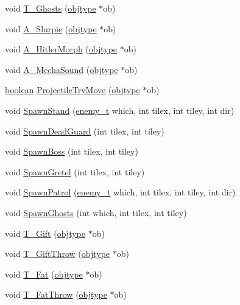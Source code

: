 \begin{DoxyCompactItemize}
\item 
void \hyperlink{WL__ACT2_8C_a6bde7f5f6c9bef2510fd97adacbfd707}{T\_\-Ghosts} (\hyperlink{structobjstruct}{objtype} $\ast$ob)
\item 
void \hyperlink{WL__ACT2_8C_ad293e10281b57a35c52a559ba0979185}{A\_\-Slurpie} (\hyperlink{structobjstruct}{objtype} $\ast$ob)
\item 
void \hyperlink{WL__ACT2_8C_a8a9aba9ebfcb76d0d265b74c5d426acf}{A\_\-HitlerMorph} (\hyperlink{structobjstruct}{objtype} $\ast$ob)
\item 
void \hyperlink{WL__ACT2_8C_ac61858cc2d5a743c8224a2a27190fb11}{A\_\-MechaSound} (\hyperlink{structobjstruct}{objtype} $\ast$ob)
\item 
\hyperlink{ID__HEAD_8H_a7c6368b321bd9acd0149b030bb8275ed}{boolean} \hyperlink{WL__ACT2_8C_a219833341ac800da7f9e17e5fb369722}{ProjectileTryMove} (\hyperlink{structobjstruct}{objtype} $\ast$ob)
\item 
void \hyperlink{WL__ACT2_8C_a50e3fd0352d390adb00570c075e6bb23}{SpawnStand} (\hyperlink{WL__DEF_8H_a170079e8c026d22e4de4683611bc7a50}{enemy\_\-t} which, int tilex, int tiley, int dir)
\item 
void \hyperlink{WL__ACT2_8C_a12fd6ce0b8165309130e7a23b2a9ec66}{SpawnDeadGuard} (int tilex, int tiley)
\item 
void \hyperlink{WL__ACT2_8C_a08321e86d04e179863c4d221b3c3d4f2}{SpawnBoss} (int tilex, int tiley)
\item 
void \hyperlink{WL__ACT2_8C_afa50c190d35b8c0951d7864b104c2d46}{SpawnGretel} (int tilex, int tiley)
\item 
void \hyperlink{WL__ACT2_8C_ac1bea4e1584964301d418e28f73a2295}{SpawnPatrol} (\hyperlink{WL__DEF_8H_a170079e8c026d22e4de4683611bc7a50}{enemy\_\-t} which, int tilex, int tiley, int dir)
\item 
void \hyperlink{WL__ACT2_8C_a1bee4148fbfe5320a96364b8bd910f27}{SpawnGhosts} (int which, int tilex, int tiley)
\item 
void \hyperlink{WL__ACT2_8C_aa143ff701cf1be118333ca0bb097bc72}{T\_\-Gift} (\hyperlink{structobjstruct}{objtype} $\ast$ob)
\item 
void \hyperlink{WL__ACT2_8C_aafd82ab19ac7b7abf6e20ad88e99e706}{T\_\-GiftThrow} (\hyperlink{structobjstruct}{objtype} $\ast$ob)
\item 
void \hyperlink{WL__ACT2_8C_a7ef997abd87b43b1e1fd675f6aefb5e8}{T\_\-Fat} (\hyperlink{structobjstruct}{objtype} $\ast$ob)
\item 
void \hyperlink{WL__ACT2_8C_aadf6b1917b9cfd2ce71e218890ce6720}{T\_\-FatThrow} (\hyperlink{structobjstruct}{objtype} $\ast$ob)

\end{DoxyCompactItemize}
